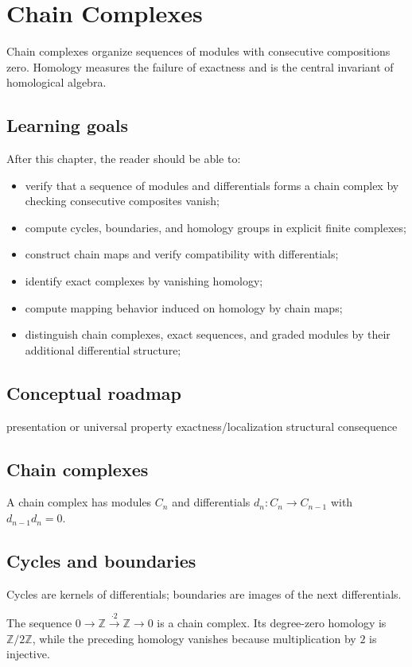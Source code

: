 \chapter{Chain Complexes}
\label{ch:v22}

Chain complexes organize sequences of modules with consecutive compositions zero. Homology measures the failure of exactness and is the central invariant of homological algebra.

\section*{Learning goals}
After this chapter, the reader should be able to:
\begin{itemize}
\item verify that a sequence of modules and differentials forms a chain complex by checking consecutive composites vanish;
\item compute cycles, boundaries, and homology groups in explicit finite complexes;
\item construct chain maps and verify compatibility with differentials;
\item identify exact complexes by vanishing homology;
\item compute mapping behavior induced on homology by chain maps;
\item distinguish chain complexes, exact sequences, and graded modules by their additional differential structure;
\end{itemize}
\section*{Conceptual roadmap}
\volroadmap
  {presentation or universal property}
  {exactness/localization}
  {structural consequence}

\section{Chain complexes}
A chain complex has modules $C_n$ and differentials $d_n:C_n\to C_{n-1}$ with $d_{n-1}d_n=0$.

\section{Cycles and boundaries}
Cycles are kernels of differentials; boundaries are images of the next differentials.

\begin{example}\label{ex:v22-expand-01}
The sequence $0\to\mathbb Z\xrightarrow{\cdot2}\mathbb Z\to0$ is a chain complex. Its degree-zero homology is $\mathbb Z/2\mathbb Z$, while the preceding homology vanishes because multiplication by $2$ is injective.
\end{example}
